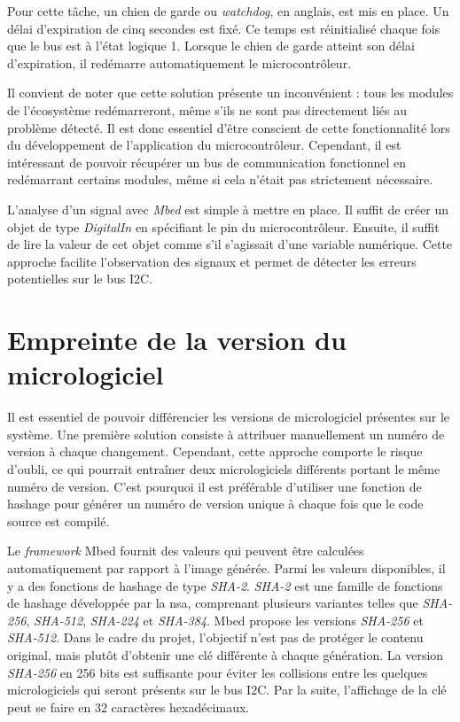 Pour cette tâche, un chien de garde ou \textit{watchdog}, en anglais, est mis en place.
Un délai d'expiration de cinq secondes est fixé.
Ce temps est réinitialisé chaque fois que le bus est à l'état logique 1.
Lorsque le chien de garde atteint son délai d'expiration, il redémarre automatiquement le microcontrôleur.

Il convient de noter que cette solution présente un inconvénient : tous les modules de l'écosystème redémarreront, même s'ils ne sont pas directement liés au problème détecté.
Il est donc essentiel d'être conscient de cette fonctionnalité lors du développement de l'application du microcontrôleur.
Cependant, il est intéressant de pouvoir récupérer un bus de communication fonctionnel en redémarrant certains modules, même si cela n'était pas strictement nécessaire.

L'analyse d'un signal avec \textit{Mbed} est simple à mettre en place.
Il suffit de créer un objet de type \textit{DigitalIn} en spécifiant le pin du microcontrôleur.
Ensuite, il suffit de lire la valeur de cet objet comme s'il s'agissait d'une variable numérique.
Cette approche facilite l'observation des signaux et permet de détecter les erreurs potentielles sur le bus I2C.

\section{Empreinte de la version du micrologiciel}

Il est essentiel de pouvoir différencier les versions de micrologiciel présentes sur le système.
Une première solution consiste à attribuer manuellement un numéro de version à chaque changement.
Cependant, cette approche comporte le risque d'oubli, ce qui pourrait entraîner deux micrologiciels différents portant le même numéro de version.
C'est pourquoi il est préférable d'utiliser une fonction de hashage pour générer un numéro de version unique à chaque fois que le code source est compilé.

Le \textit{\gls{framework}} Mbed fournit des valeurs qui peuvent être calculées automatiquement par rapport à l'image générée.
Parmi les valeurs disponibles, il y a des fonctions de hashage de type \textit{SHA-2}. \textit{SHA-2} est une famille de fonctions de hashage développée par la \gls{nsa}, comprenant plusieurs variantes telles que \textit{SHA-256}, \textit{SHA-512}, \textit{SHA-224} et \textit{SHA-384}.
Mbed propose les versions \textit{SHA-256} et \textit{SHA-512}.
Dans le cadre du projet, l'objectif n'est pas de protéger le contenu original, mais plutôt d'obtenir une clé différente à chaque génération.
La version \textit{SHA-256} en 256 bits est suffisante pour éviter les collisions entre les quelques micrologiciels qui seront présents sur le bus I2C.
Par la suite, l'affichage de la clé peut se faire en 32 caractères hexadécimaux.

